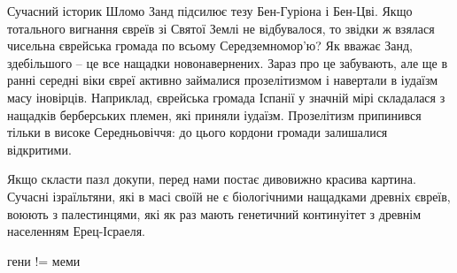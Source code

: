 Сучасний історик Шломо Занд підсилює тезу Бен-Гуріона і Бен-Цві. Якщо
тотального вигнання євреїв зі Святої Землі не відбувалося, то звідки ж взялася
чисельна єврейська громада по всьому Середземномор'ю? Як вважає Занд,
здебільшого – це все нащадки новонавернених. Зараз про це забувають, але ще в
ранні середні віки євреї активно займалися прозелітизмом і навертали в іудаїзм
масу іновірців. Наприклад, єврейська громада Іспанії у значній мірі складалася
з нащадків берберських племен, які приняли іудаїзм. Прозелітизм припинився
тільки в високе Середньовіччя: до цього кордони громади залишалися відкритими.

Якщо скласти пазл докупи, перед нами постає дивовижно красива картина. Сучасні
ізраїльтяни, які в масі своїй не є біологічними нащадками древніх євреїв,
воюють з палестинцями, які як раз мають генетичний континуітет з древнім
населенням Ерец-Ісраеля.

гени != меми
